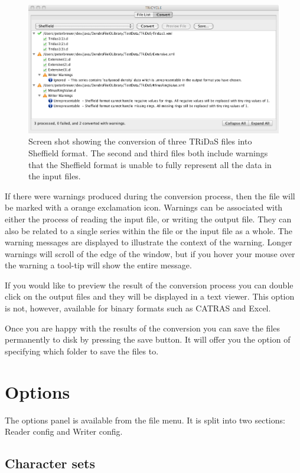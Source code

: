 \documentclass[10pt, headsepline,DIV14,BCOR0.5cm]{scrreprt}
\begin{document}
\begin{figure}
\includegraphics[width=\textwidth]{screenshot1.png}
\caption{Screen shot showing the conversion of three TRiDaS files into Sheffield
format. The second and third files both include warnings that the Sheffield format
is unable to fully represent all the data in the input files.} 
\label{fig:screenshot}
\end{figure}

If there were warnings produced during the conversion process, then the file will be marked with a orange
exclamation icon. Warnings can be associated with either the process of reading the input file, or writing
the output file. They can also be related to a single series within the file or the input file as a whole. The
warning messages are displayed to illustrate the context of the warning. Longer warnings will scroll of the
edge of the window, but if you hover your mouse over the warning a tool-tip will show the entire message.

If you would like to preview the result of the conversion process you can double click on the output files
and they will be displayed in a text viewer. This option is not, however, available for binary formats such
as CATRAS and Excel.

Once you are happy with the results of the conversion you can save the files permanently to disk by pressing
the save button. It will offer you the option of specifying which folder to save the files to.


\chapter{Options}

The options panel is available from the file menu. It is split into two sections: Reader config and Writer
config.

\section{Character sets}
\end{document}
